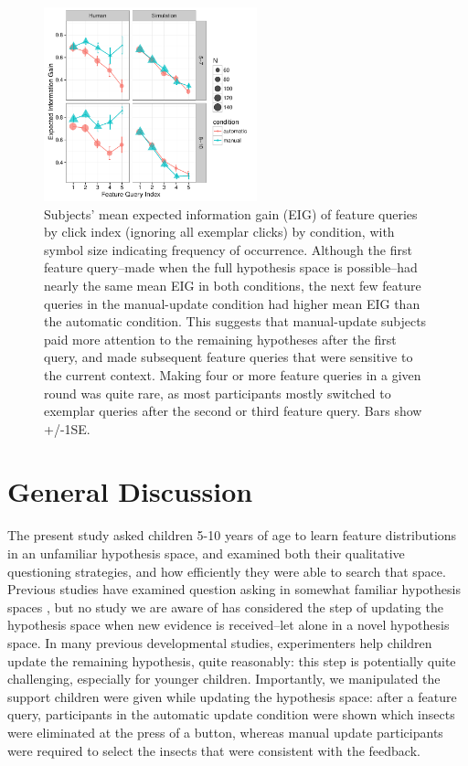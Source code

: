 \documentclass[man,floatsintext]{apa6}
\begin{document}
 \begin{figure}[!h]
 \centering
  \includegraphics[width=0.55\textwidth]{figures/info_gain_by_click_n_age_w_sims} %
  \caption{Subjects' mean expected information gain (EIG) of feature queries by click index (ignoring all exemplar clicks) by condition, with symbol size indicating frequency of occurrence. Although the first feature query--made when the full hypothesis space is possible--had nearly the same mean EIG in both conditions, the next few feature queries in the manual-update condition had higher mean EIG than the automatic condition. This suggests that manual-update subjects paid more attention to the remaining hypotheses after the first query, and made subsequent feature queries that were sensitive to the current context. Making four or more feature queries in a given round was quite rare, as most participants mostly switched to exemplar queries after the second or third feature query. Bars show +/-1SE.}
  \label{fig:EIG_by_click}
 \end{figure} 


\section{General Discussion}

The present study asked children 5-10 years of age to learn feature distributions in an unfamiliar hypothesis space, and examined both their qualitative questioning strategies, and how efficiently they were able to search that space. Previous studies have examined question asking in somewhat familiar hypothesis spaces \cite{Herwig:1982,Mosher:1966,Nelson:2014,Ruggeri:2014,Ruggeri:2015}, but no study we are aware of has considered the step of updating the hypothesis space when new evidence is received--let alone in a novel hypothesis space. In many previous developmental studies, experimenters help children update the remaining hypothesis, quite reasonably: this step is potentially quite challenging, especially for younger children.  Importantly, we manipulated the support children were  given while updating the hypothesis space: after a feature query, participants in the 
automatic update condition were shown which insects were eliminated at the press of 
a button, whereas manual update participants were required to select the insects that 
were consistent with the feedback. 
\end{document}
